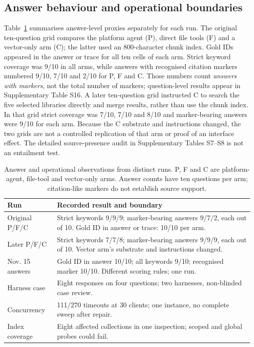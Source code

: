 \subsection{Answer behaviour and operational boundaries}
\label{sec:e5}\label{sec:agentic}\label{sec:abstention}
\label{sec:composition}\label{sec:eval-agent}\label{sec:sysarms}\label{sec:e7}
Table~\ref{tab:e5-answers} summarises answer-level proxies separately for each
run. The original ten-question grid compares the platform agent (P), direct
file tools (F) and a vector-only arm (C); the latter used an 800-character
chunk index. Gold IDs appeared in the answer or trace for all ten cells of
each arm. Strict keyword coverage was 9/10 in all arms, while answers with
recognised citation markers numbered 9/10, 7/10 and 2/10 for P, F and C.
Those numbers count \emph{answers with markers}, not the total number of
markers; question-level results appear in Supplementary Table S16. A later ten-question grid instructed C to search the five selected
libraries directly and merge results, rather than use the chunk index. In that
grid strict coverage was 7/10, 7/10 and 8/10 and marker-bearing answers were
9/10 for each arm. Because the C substrate and instructions changed, the two
grids are not a controlled replication of that arm or proof of an interface
effect. The detailed source-presence audit in Supplementary Tables S7--S8 is
not an entailment test.

\begin{table}[t]
\centering
\small
\setlength{\tabcolsep}{3pt}
\caption{Answer and operational observations from distinct runs. P, F and C
are platform-agent, file-tool and vector-only arms. Answer counts have ten
questions per arm; citation-like markers do not establish source support.}
\label{tab:e5-answers}
\begin{tabular}{@{}p{}p{}@{}}
\toprule
Run & Recorded result and boundary \\
\midrule
Original P/F/C & Strict keywords 9/9/9; marker-bearing answers 9/7/2, each out of 10. Gold ID in answer or trace: 10/10 per arm. \\
Later P/F/C & Strict keywords 7/7/8; marker-bearing answers 9/9/9, each out of 10. Vector arm's substrate and instructions changed. \\
Nov. 15 answers & Gold ID in answer 10/10; all keywords 9/10; recognised marker 10/10. Different scoring rules; one run. \\
Harness case & Eight responses on four questions; two harnesses, non-blinded case review. \\
Concurrency & 111/270 timeouts at 30 clients; one instance, no complete sweep after repair. \\
Index coverage & Eight affected collections in one inspection; scoped and global probes could fail. \\
\bottomrule
\end{tabular}
\end{table}

